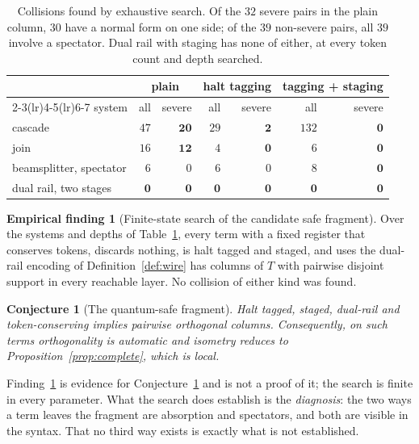 \documentclass[11pt,a4paper]{article}
\theoremstyle{plain}
\newtheorem{conjecture}[theorem]{Conjecture}
\theoremstyle{definition}
\newtheorem{finding}[theorem]{Empirical finding}
\theoremstyle{remark}
\begin{document}
\begin{table}[h]
\centering\small
\begin{tabular}{@{}lrrrrrr@{}}
\toprule
& \multicolumn{2}{c}{plain}
& \multicolumn{2}{c}{halt tagging}
& \multicolumn{2}{c}{tagging + staging}\\
\cmidrule(lr){2-3}\cmidrule(lr){4-5}\cmidrule(lr){6-7}
system & all & severe & all & severe & all & severe\\
\midrule
cascade                & $47$ & $\mathbf{20}$ & $29$ & $\mathbf{2}$ & $132$ & $\mathbf{0}$\\
join                   & $16$ & $\mathbf{12}$ & $4$  & $\mathbf{0}$ & $6$   & $\mathbf{0}$\\
beamsplitter, spectator& $6$  & $0$ & $6$ & $0$ & $8$ & $\mathbf{0}$\\
dual rail, two stages  & $\mathbf{0}$ & $\mathbf{0}$ & $\mathbf{0}$ & $\mathbf{0}$ & $\mathbf{0}$ & $\mathbf{0}$\\
\bottomrule
\end{tabular}
\caption{Collisions found by exhaustive search. Of the $32$ severe pairs in the
plain column, $30$ have a normal form on one side; of the $39$ non-severe pairs,
all $39$ involve a spectator. Dual rail with staging has none of either, at
every token count and depth searched.}\label{tab:collisions}
\end{table}

\begin{finding}[Finite-state search of the candidate safe fragment]\label{find:safe}
Over the systems and depths of Table~\ref{tab:collisions}, every term with a
fixed register that conserves tokens, discards nothing, is halt tagged and
staged, and uses the dual-rail encoding of Definition~\ref{def:wire} has columns
of $T$ with pairwise disjoint support in every reachable layer. No collision of
either kind was found.
\end{finding}

\begin{conjecture}[The quantum-safe fragment]\label{conj:safe}
\emph{Halt tagged, staged, dual-rail and token-conserving implies pairwise
orthogonal columns.} Consequently, on such terms orthogonality is automatic and
isometry reduces to Proposition~\ref{prop:complete}, which is local.
\end{conjecture}

Finding~\ref{find:safe} is evidence for Conjecture~\ref{conj:safe} and is not a
proof of it; the search is finite in every parameter. What the search does
establish is the \emph{diagnosis}: the two ways a term leaves the fragment are
absorption and spectators, and both are visible in the syntax. That no third way
exists is exactly what is not established.
\end{document}
